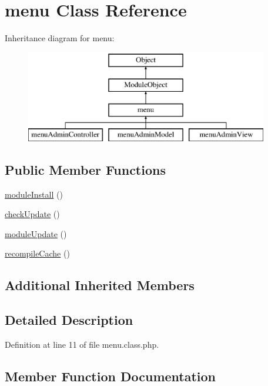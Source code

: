 \hypertarget{classmenu}{}\section{menu Class Reference}
\label{classmenu}
Inheritance diagram for menu\+:\begin{figure}[H]
\begin{center}
\leavevmode
\includegraphics[height=4.000000cm]{classmenu}
\end{center}
\end{figure}
\subsection*{Public Member Functions}
\begin{DoxyCompactItemize}
\item 
\hyperlink{classmenu_ae8c300e3fc86ad4a834e489d849c69e1}{module\+Install} ()
\item 
\hyperlink{classmenu_a42090ef27569489938b28486eec60922}{check\+Update} ()
\item 
\hyperlink{classmenu_aa9eb9adadde15b730b887564b9184023}{module\+Update} ()
\item 
\hyperlink{classmenu_a583aef0b15f6391d8e591f3498755f2e}{recompile\+Cache} ()
\end{DoxyCompactItemize}
\subsection*{Additional Inherited Members}


\subsection{Detailed Description}


Definition at line 11 of file menu.\+class.\+php.



\subsection{Member Function Documentation}
\hypertarget{classmenu_a42090ef27569489938b28486eec60922}{}\label{classmenu_a42090ef27569489938b28486eec60922} 
